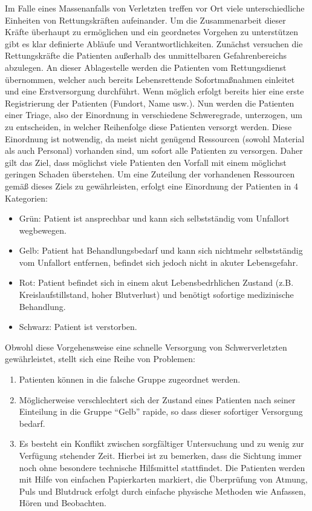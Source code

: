 Im Falle eines Massenanfalls von Verletzten treffen vor Ort viele unterschiedliche Einheiten von
Rettungskräften aufeinander. Um die Zusammenarbeit dieser Kräfte überhaupt zu ermöglichen und ein
geordnetes Vorgehen zu unterstützen gibt es klar definierte Abläufe und Verantwortlichkeiten. Zunächst
versuchen die Rettungskräfte die Patienten außerhalb des unmittelbaren Gefahrenbereichs abzulegen.
An dieser Ablagestelle werden die Patienten vom Rettungsdienst übernommen, welcher auch bereits
Lebensrettende Sofortmaßnahmen einleitet und eine Erstversorgung durchführt. Wenn möglich erfolgt
bereits hier eine erste Registrierung der Patienten (Fundort, Name usw.).
Nun werden die Patienten einer Triage, also der Einordnung in verschiedene Schweregrade,
unterzogen, um zu entscheiden, in welcher Reihenfolge diese Patienten versorgt werden.
Diese Einordnung ist notwendig, da meist nicht genügend Ressourcen (sowohl Material als auch
Personal) vorhanden sind, um sofort alle Patienten zu versorgen. Daher gilt das Ziel, dass möglichst
viele Patienten den Vorfall mit einem möglichst geringen Schaden überstehen. Um eine Zuteilung der
vorhandenen Ressourcen gemäß dieses Ziels zu gewährleisten, erfolgt eine Einordnung der Patienten in
4 Kategorien:

\begin{itemize}
    \item{Grün:} Patient ist ansprechbar und kann sich selbstständig vom Unfallort wegbewegen.
    \item{Gelb:} Patient hat Behandlungsbedarf und kann sich nichtmehr selbstständig vom Unfallort entfernen, 
                 befindet sich jedoch nicht in akuter Lebensgefahr.
    \item{Rot:}  Patient befindet sich in einem akut Lebensbedrhlichen Zustand (z.B. Kreislaufstillstand, hoher
                 Blutverlust) und benötigt sofortige medizinische Behandlung.
    \item{Schwarz:} Patient ist verstorben.
\end{itemize}

Obwohl diese Vorgehensweise eine schnelle Versorgung von Schwerverletzten gewährleistet, stellt
sich eine Reihe von Problemen:

\begin{enumerate}
    \item Patienten können in die falsche Gruppe zugeordnet werden.
    \item Möglicherweise verschlechtert sich der Zustand eines Patienten nach seiner Einteilung in die Gruppe
          "`Gelb"' rapide, so dass dieser sofortiger Versorgung bedarf.
    \item Es besteht ein Konflikt zwischen sorgfältiger Untersuchung und zu wenig zur Verfügung stehender
          Zeit. Hierbei ist zu bemerken, dass die Sichtung immer noch ohne besondere technische Hilfsmittel
          stattfindet. Die Patienten werden mit Hilfe von einfachen Papierkarten markiert, die Überprüfung von
          Atmung, Puls und Blutdruck erfolgt durch einfache physische Methoden wie Anfassen, Hören und
          Beobachten.
\end{enumerate}

